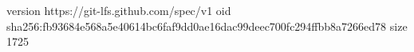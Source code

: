 version https://git-lfs.github.com/spec/v1
oid sha256:fb93684e568a5e40614bc6faf9dd0ae16dac99deec700fc294ffbb8a7266ed78
size 1725
